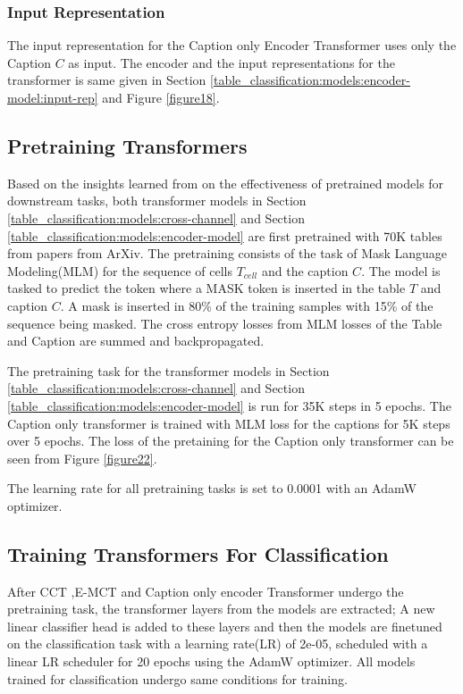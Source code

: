 \subsubsection{Input Representation}
The input representation for the Caption only Encoder Transformer uses only the Caption $C$ as input. The encoder and the input representations for the transformer is same given in Section \ref{table_classification:models:encoder-model:input-rep} and Figure \ref{figure18}.

\subsection{Pretraining Transformers}
\label{table_classification:pre-train}
Based on the insights learned from \cite{hernandez2021scaling} on the effectiveness of pretrained models for downstream tasks, both transformer models in Section \ref{table_classification:models:cross-channel} and Section \ref{table_classification:models:encoder-model} are first pretrained with 70K tables from papers from ArXiv. The pretraining consists of the task of Mask Language Modeling(MLM) for the sequence of cells $T_{cell}$ and the caption $C$. The model is tasked to predict the token where a MASK token is inserted in the table $T$ and caption $C$. A mask is inserted in 80\% of the training samples with 15\% of the sequence being masked. The cross entropy losses from MLM losses of the Table and Caption are summed and backpropagated.

The pretraining task for the transformer models in Section \ref{table_classification:models:cross-channel} and Section \ref{table_classification:models:encoder-model} is run for 35K steps in 5 epochs. The Caption only transformer is trained with MLM loss for the captions for 5K steps over 5 epochs. The loss of the pretaining for the Caption only transformer can be seen from Figure \ref{figure22}. 

The learning rate for all pretraining tasks is set to 0.0001 with an AdamW \parencite{loshchilov2017decoupled} optimizer. 

\subsection{Training Transformers For Classification}
\label{table_classification:models:class-task}
After CCT ,E-MCT and Caption only encoder Transformer undergo the pretraining task, the transformer layers from the models are extracted; A new linear classifier head is added to these layers and then the models are finetuned on the classification task with a learning rate(LR) of 2e-05, scheduled with a linear LR scheduler for 20 epochs using the AdamW optimizer. All models trained for classification undergo same conditions for training. 

